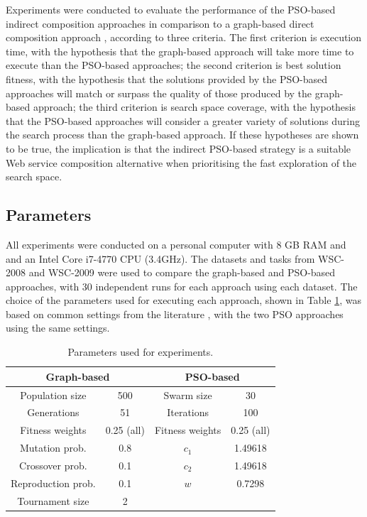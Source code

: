 \documentclass{llncs}
\begin{document}
Experiments were conducted to evaluate the performance of the PSO-based indirect composition approaches in comparison to a graph-based direct composition approach \cite{da2015graphevol}, according to three criteria. The first criterion is execution time, with the hypothesis that the graph-based approach will take more time to execute than the PSO-based approaches; the second criterion is best solution fitness, with the hypothesis that the solutions provided by the PSO-based approaches will match or surpass the quality of those produced by the graph-based approach; the third criterion is search space coverage, with the hypothesis that the PSO-based approaches will consider a greater variety of solutions during the search process than the graph-based approach. If these hypotheses are shown to be true, the implication is that the indirect PSO-based strategy is a suitable Web service composition alternative when prioritising the fast exploration of the search space.

\subsection{Parameters}

All experiments were conducted on a personal computer with 8 GB RAM and and an Intel Core i7-4770 CPU (3.4GHz). The datasets and tasks from WSC-2008 \cite{bansal2008wsc} and WSC-2009 \cite{kona2009wsc} were used to compare the graph-based and PSO-based approaches, with 30 independent runs for each approach using each dataset. The choice of the parameters used for executing each approach, shown in Table \ref{tab:parameters}, was based on common settings from the literature \cite{koza1992genetic,eberhart2001particle}, with the two PSO approaches using the same settings.

\begin{table}[h]
\centering
\caption{Parameters used for experiments.}
\label{tab:parameters}
\begin{tabular}{|c|c|c|c|}
\hline
\multicolumn{2}{|c|}{{\bf Graph-based}} & \multicolumn{2}{c|}{{\bf PSO-based}} \\ \hline
Population size        & 500            & Swarm size          & 30             \\ \hline
Generations            & 51             & Iterations          & 100            \\ \hline
Fitness weights        & 0.25 (all)     & Fitness weights     & 0.25 (all)     \\ \hline
Mutation prob.         & 0.8            & $c_1$               & 1.49618        \\ \hline
Crossover prob.        & 0.1            & $c_2$               & 1.49618        \\ \hline
Reproduction prob.     & 0.1            & $w$                 & 0.7298         \\ \hline
Tournament size        & 2              &                     &                \\ \hline
\end{tabular}
\end{table}
\end{document}
